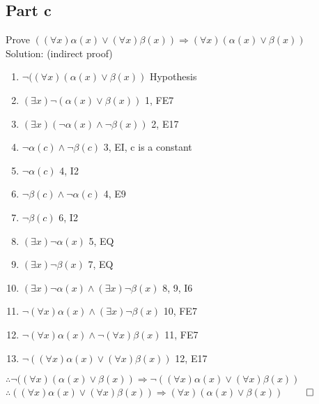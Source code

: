 \documentclass{article}
\begin{document}
		\subsection{Part c}
			Prove $((\forall x)\alpha(x) \lor (\forall x)\beta(x)) \Rightarrow (\forall x)(\alpha(x) \lor \beta(x))$ \\
			Solution: (indirect proof) \\
			\begin{enumerate}
				\item $\lnot((\forall x)(\alpha(x) \lor \beta(x))$ \hfill Hypothesis
				\item $(\exists x)\lnot(\alpha(x) \lor \beta(x))$ \hfill 1, FE7
				\item $(\exists x)(\lnot\alpha(x) \land \lnot\beta(x))$ \hfill 2, E17
				\item $\lnot\alpha(c) \land \lnot\beta(c)$ \hfill 3, EI, c is a constant
				\item $\lnot\alpha(c)$ \hfill 4, I2 
				\item $\lnot\beta(c) \land \lnot\alpha(c)$ \hfill 4, E9 
				\item $\lnot\beta(c)$ \hfill 6, I2
				\item $(\exists x)\lnot\alpha(x)$ \hfill 5, EQ
				\item $(\exists x)\lnot\beta(x)$ \hfill 7, EQ
				\item $(\exists x)\lnot\alpha(x) \land (\exists x)\lnot\beta(x)$ \hfill 8, 9, I6
				\item $\lnot(\forall x)\alpha(x) \land (\exists x)\lnot\beta(x)$ \hfill 10, FE7
				\item $\lnot(\forall x)\alpha(x) \land \lnot(\forall x)\beta(x)$ \hfill 11, FE7
				\item $\lnot((\forall x)\alpha(x) \lor (\forall x)\beta(x))$ \hfill 12, E17
			\end{enumerate}
			$\therefore \lnot((\forall x)(\alpha(x) \lor \beta(x)) \Rightarrow \lnot((\forall x)\alpha(x) \lor (\forall x)\beta(x))$ \\
			$\therefore ((\forall x)\alpha(x) \lor (\forall x)\beta(x)) \Rightarrow (\forall x)(\alpha(x) \lor \beta(x))$ \hfill $\qed$ \\
\end{document}

